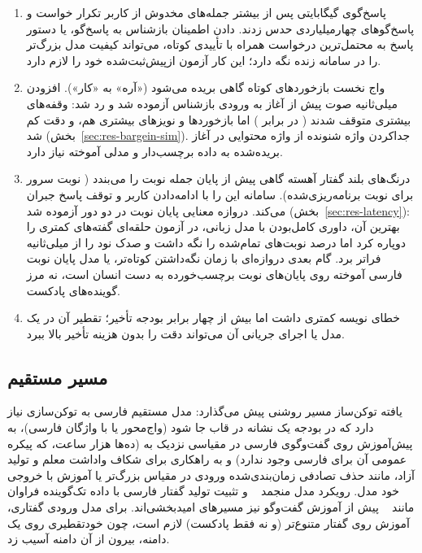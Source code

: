\begin{enumerate}
\item {} پاسخ‌گوی  گیگابایتی پس
      از بیشتر جمله‌های مخدوش از کاربر تکرار خواست و پاسخ‌گوهای چهارمیلیاردی حدس
      زدند. دادن اطمینان بازشناس به پاسخ‌گو، یا دستور پاسخ به محتمل‌ترین درخواست
      همراه با تأییدی کوتاه، می‌تواند کیفیت مدل بزرگ‌تر را در سامانه زنده نگه دارد؛
      این کار آزمون ازپیش‌ثبت‌شده خود را لازم دارد.
\item {} واج نخست بازخوردهای کوتاه گاهی بریده می‌شود
      («آره» به «کار»). افزودن  میلی‌ثانیه صوت پیش از آغاز به ورودی
      بازشناس آزموده شد و رد شد: وقفه‌های بیشتری متوقف شدند ( در برابر
      ) اما بازخوردها و نویزهای بیشتری هم، و دقت کم شد
      (بخش~\ref{sec:res-bargein-sim}). جداکردن واژه شنونده از واژه محتوایی در
      آغاز بریده‌شده به داده برچسب‌دار و مدلی آموخته نیاز دارد.
\item {} درنگ‌های بلند گفتار آهسته گاهی
      پیش از پایان جمله نوبت را می‌بندد ( نوبت سرور برای  نوبت
      برنامه‌ریزی‌شده). سامانه این را با ادامه‌دادن کاربر و توقف پاسخ جبران
      می‌کند. دروازه معنایی پایان نوبت در دو دور آزموده شد (بخش~\ref{sec:res-latency}):
      بهترین آن، داوری کامل‌بودن با مدل زبانی، در آزمون حلقه‌ای گفته‌های کمتری را
      دوپاره کرد اما  درصد نوبت‌های تمام‌شده را نگه داشت و صدک نود را از
       میلی‌ثانیه فراتر برد. گام بعدی دروازه‌ای با زمان نگه‌داشتن کوتاه‌تر، یا
      مدل پایان نوبت فارسی آموخته روی پایان‌های نوبت برچسب‌خورده به دست انسان است،
      نه مرز گوینده‌های پادکست.
\item {}  خطای نویسه کمتری
      داشت اما بیش از چهار برابر بودجه تأخیر؛ تقطیر آن در یک مدل 
      یا اجرای جریانی آن می‌تواند دقت را بدون هزینه تأخیر بالا ببرد.
\end{enumerate}

\subsection{مسیر مستقیم}

یافته توکن‌ساز مسیر روشنی پیش می‌گذارد: مدل مستقیم فارسی به توکن‌سازی نیاز
دارد که در بودجه یک نشانه در قاب جا شود (واج‌محور یا با واژگان فارسی)، به
پیش‌آموزش روی گفت‌وگوی فارسی در مقیاسی نزدیک به  (ده‌ها هزار
ساعت، که پیکره عمومی آن برای فارسی وجود ندارد) و به راهکاری برای شکاف واداشت معلم و تولید آزاد، مانند حذف تصادفی زمان‌بندی‌شده
ورودی در مقیاس بزرگ‌تر یا آموزش با خروجی خود مدل. رویکرد مدل منجمد
~\cite{wang2025freezeomni} و تثبیت تولید گفتار فارسی با داده
تک‌گوینده فراوان مانند ~\cite{qharabagh2025manatts} پیش از
آموزش گفت‌وگو نیز مسیرهای امیدبخشی‌اند. برای مدل ورودی گفتاری، آموزش روی گفتار
متنوع‌تر (و نه فقط پادکست) لازم است، چون خودتقطیری روی یک دامنه، بیرون از آن
دامنه آسیب زد.

